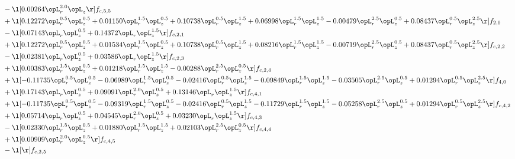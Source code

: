 \begin{alignat}{2}
& - \l[  0.00264 \opL_r^{2.0} \opL_z  \r] f_{c,5,5} \nonumber \\ 
& + \l[  0.12272 \opL_r^{0.5} \opL_z^{0.5} +  0.01150 \opL_r^{1.5} \opL_z^{0.5} +  0.10738 \opL_r^{0.5} \opL_z^{1.5} +  0.06998 \opL_r^{1.5} \opL_z^{1.5}   -0.00479 \opL_r^{2.5} \opL_z^{0.5} +  0.08437 \opL_r^{0.5} \opL_z^{2.5}  \r] f_{2,0} \nonumber \\ 
& - \l[  0.07143 \opL_r \opL_z^{0.5} +  0.14372 \opL_r \opL_z^{1.5}  \r] f_{c,2,1} \nonumber \\ 
& + \l[  0.12272 \opL_r^{0.5} \opL_z^{0.5} +  0.01534 \opL_r^{1.5} \opL_z^{0.5} +  0.10738 \opL_r^{0.5} \opL_z^{1.5} +  0.08216 \opL_r^{1.5} \opL_z^{1.5}   -0.00719 \opL_r^{2.5} \opL_z^{0.5} +  0.08437 \opL_r^{0.5} \opL_z^{2.5}  \r] f_{c,2,2} \nonumber \\ 
& - \l[  0.02381 \opL_r \opL_z^{0.5} +  0.03586 \opL_r \opL_z^{1.5}  \r] f_{c,2,3} \nonumber \\ 
& + \l[  0.00383 \opL_r^{1.5} \opL_z^{0.5} +  0.01218 \opL_r^{1.5} \opL_z^{1.5}   -0.00288 \opL_r^{2.5} \opL_z^{0.5}  \r] f_{c,2,4} \nonumber \\ 
& + \l[  -0.11735 \opL_r^{0.5} \opL_z^{0.5}   -0.06989 \opL_r^{1.5} \opL_z^{0.5}   -0.02416 \opL_r^{0.5} \opL_z^{1.5}   -0.09849 \opL_r^{1.5} \opL_z^{1.5}   -0.03505 \opL_r^{2.5} \opL_z^{0.5} +  0.01294 \opL_r^{0.5} \opL_z^{2.5}  \r] f_{4,0} \nonumber \\ 
& + \l[  0.17143 \opL_r \opL_z^{0.5} +  0.09091 \opL_r^{2.0} \opL_z^{0.5} +  0.13146 \opL_r \opL_z^{1.5}  \r] f_{c,4,1} \nonumber \\ 
& + \l[  -0.11735 \opL_r^{0.5} \opL_z^{0.5}   -0.09319 \opL_r^{1.5} \opL_z^{0.5}   -0.02416 \opL_r^{0.5} \opL_z^{1.5}   -0.11729 \opL_r^{1.5} \opL_z^{1.5}   -0.05258 \opL_r^{2.5} \opL_z^{0.5} +  0.01294 \opL_r^{0.5} \opL_z^{2.5}  \r] f_{c,4,2} \nonumber \\ 
& + \l[  0.05714 \opL_r \opL_z^{0.5} +  0.04545 \opL_r^{2.0} \opL_z^{0.5} +  0.03230 \opL_r \opL_z^{1.5}  \r] f_{c,4,3} \nonumber \\ 
& - \l[  0.02330 \opL_r^{1.5} \opL_z^{0.5} +  0.01880 \opL_r^{1.5} \opL_z^{1.5} +  0.02103 \opL_r^{2.5} \opL_z^{0.5}  \r] f_{c,4,4} \nonumber \\ 
& + \l[  0.00909 \opL_r^{2.0} \opL_z^{0.5}  \r] f_{c,4,5} \nonumber \\ 
& - \l[  \r] f_{c,2,5} \nonumber \\ 
\end{alignat} 


